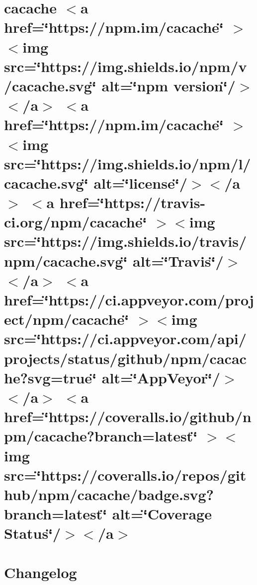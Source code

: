 \documentclass[twoside]{book}
\newcommand{\+}{\discretionary{\mbox{\scriptsize$\hookleftarrow$}}{}{}}
\begin{document}
\chapter{cacache \texorpdfstring{$<$}{<}a href=\char`\"{}https\+://npm.\+im/cacache\char`\"{} \texorpdfstring{$>$}{>}\texorpdfstring{$<$}{<}img src=\char`\"{}https\+://img.\+shields.\+io/npm/v/cacache.\+svg\char`\"{} alt=\char`\"{}npm version\char`\"{}/\texorpdfstring{$>$}{>}\texorpdfstring{$<$}{<}/a\texorpdfstring{$>$}{>} \texorpdfstring{$<$}{<}a href=\char`\"{}https\+://npm.\+im/cacache\char`\"{} \texorpdfstring{$>$}{>}\texorpdfstring{$<$}{<}img src=\char`\"{}https\+://img.\+shields.\+io/npm/l/cacache.\+svg\char`\"{} alt=\char`\"{}license\char`\"{}/\texorpdfstring{$>$}{>}\texorpdfstring{$<$}{<}/a\texorpdfstring{$>$}{>} \texorpdfstring{$<$}{<}a href=\char`\"{}https\+://travis-\/ci.\+org/npm/cacache\char`\"{} \texorpdfstring{$>$}{>}\texorpdfstring{$<$}{<}img src=\char`\"{}https\+://img.\+shields.\+io/travis/npm/cacache.\+svg\char`\"{} alt=\char`\"{}\+Travis\char`\"{}/\texorpdfstring{$>$}{>}\texorpdfstring{$<$}{<}/a\texorpdfstring{$>$}{>} \texorpdfstring{$<$}{<}a href=\char`\"{}https\+://ci.\+appveyor.\+com/project/npm/cacache\char`\"{} \texorpdfstring{$>$}{>}\texorpdfstring{$<$}{<}img src=\char`\"{}https\+://ci.\+appveyor.\+com/api/projects/status/github/npm/cacache?svg=true\char`\"{} alt=\char`\"{}\+App\+Veyor\char`\"{}/\texorpdfstring{$>$}{>}\texorpdfstring{$<$}{<}/a\texorpdfstring{$>$}{>} \texorpdfstring{$<$}{<}a href=\char`\"{}https\+://coveralls.\+io/github/npm/cacache?branch=latest\char`\"{} \texorpdfstring{$>$}{>}\texorpdfstring{$<$}{<}img src=\char`\"{}https\+://coveralls.\+io/repos/github/npm/cacache/badge.\+svg?branch=latest\char`\"{} alt=\char`\"{}\+Coverage Status\char`\"{}/\texorpdfstring{$>$}{>}\texorpdfstring{$<$}{<}/a\texorpdfstring{$>$}{>}}
\label{md__c___users_vaishnavi_jadhav__desktop__developer_code_mean_stack_example_client_node_modules_cacache__r_e_a_d_m_e}

\chapter{Changelog}
\label{md__c___users_vaishnavi_jadhav__desktop__developer_code_mean_stack_example_client_node_modules_call_bind__c_h_a_n_g_e_l_o_g}

\end{document}
